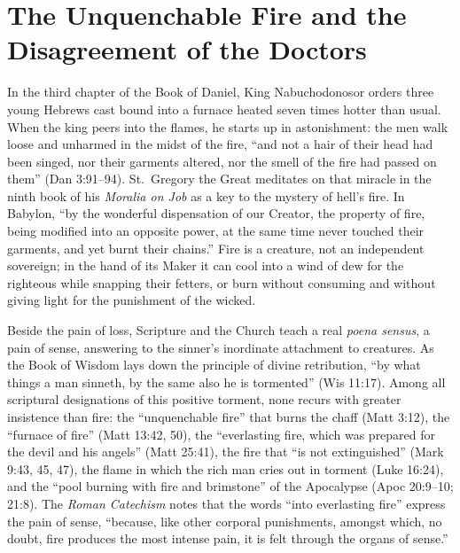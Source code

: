 \section{The Unquenchable Fire and the Disagreement of the Doctors}

In the third chapter of the Book of Daniel, King Nabuchodonosor orders three young Hebrews cast bound into a furnace heated seven times hotter than usual. When the king peers into the flames, he starts up in astonishment: the men walk loose and unharmed in the midst of the fire, ``and not a hair of their head had been singed, nor their garments altered, nor the smell of the fire had passed on them'' (Dan 3:91--94). St.\ Gregory the Great meditates on that miracle in the ninth book of his \textit{Moralia on Job} as a key to the mystery of hell's fire. In Babylon, ``by the wonderful dispensation of our Creator, the property of fire, being modified into an opposite power, at the same time never touched their garments, and yet burnt their chains.'' Fire is a creature, not an independent sovereign; in the hand of its Maker it can cool into a wind of dew for the righteous while snapping their fetters, or burn without consuming and without giving light for the punishment of the wicked.

Beside the pain of loss, Scripture and the Church teach a real \textit{poena sensus}, a pain of sense, answering to the sinner's inordinate attachment to creatures. As the Book of Wisdom lays down the principle of divine retribution, ``by what things a man sinneth, by the same also he is tormented'' (Wis 11:17). Among all scriptural designations of this positive torment, none recurs with greater insistence than fire: the ``unquenchable fire'' that burns the chaff (Matt 3:12), the ``furnace of fire'' (Matt 13:42, 50), the ``everlasting fire, which was prepared for the devil and his angels'' (Matt 25:41), the fire that ``is not extinguished'' (Mark 9:43, 45, 47), the flame in which the rich man cries out in torment (Luke 16:24), and the ``pool burning with fire and brimstone'' of the Apocalypse (Apoc 20:9--10; 21:8). The \textit{Roman Catechism} notes that the words ``into everlasting fire'' express the pain of sense, ``because, like other corporal punishments, amongst which, no doubt, fire produces the most intense pain, it is felt through the organs of sense.''

